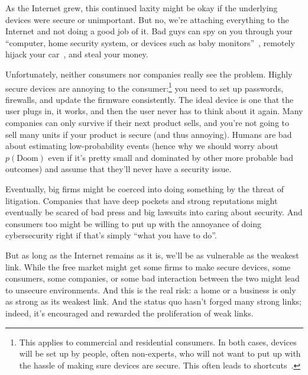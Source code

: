 As the Internet grew, this continued laxity might be okay if the underlying devices were secure or
unimportant.
%
But no, we're attaching everything to the Internet and not doing
a good job of it.
%
Bad guys can spy on you through your ``computer, home security system,
or devices such as baby monitors''~\citep{andrews-15}, remotely hijack
your car~\citep{miller-15}, and steal your money.

Unfortunately, neither consumers nor companies really see the problem.
Highly secure devices are annoying to the consumer:\footnote{This
  applies to commercial and residential consumers.  In both cases,
  devices will be set up by people, often non-experts, who will not
  want to put up with the hassle of making sure devices are secure.
  This often leads to shortcuts~\citep{}.}  you need to set up
passwords, firewalls, and update the firmware consistently.  The ideal
device is one that the user plugs in, it works, and then the user
never has to think about it again.
%
Many companies can only survive if
their next product sells, and you're not going to sell many units if
your product is secure (and thus annoying).
%
Humans are bad about estimating low-probability events (hence why we
should worry about $p(\mbox{Doom})$ even if it's pretty small and
dominated by other more probable bad outcomes) and assume that they'll
never have a security issue.


Eventually, big firms might be coerced into doing something by the
threat of litigation.  Companies that have deep pockets and strong
reputations might eventually be scared of bad press and big lawsuits
into caring about security.  And consumers too might be willing to put
up with the annoyance of doing cybersecurity right if that's simply
``what you have to do''.

But as long as the Internet remains as it is, we'll be as vulnerable
as the weakest link.  While the free market might get some firms to
make secure devices, some consumers, some companies, or some bad
interaction between the two might lead to unsecure environments.  And
this is the real risk: a home or a business is only as strong as its
weakest link.  And the status quo hasn't forged many strong links;
indeed, it's encouraged and rewarded the proliferation of weak links.


